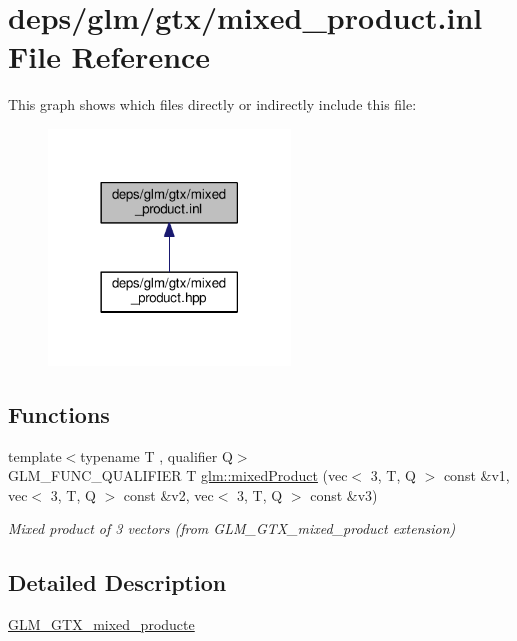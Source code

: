 \hypertarget{mixed__product_8inl}{}\section{deps/glm/gtx/mixed\+\_\+product.inl File Reference}
\label{mixed__product_8inl}
This graph shows which files directly or indirectly include this file\+:
\nopagebreak
\begin{figure}[H]
\begin{center}
\leavevmode
\includegraphics[width=182pt]{d0/d78/mixed__product_8inl__dep__incl}
\end{center}
\end{figure}
\subsection*{Functions}
\begin{DoxyCompactItemize}
\item 
{\footnotesize template$<$typename T , qualifier Q$>$ }\\G\+L\+M\+\_\+\+F\+U\+N\+C\+\_\+\+Q\+U\+A\+L\+I\+F\+I\+ER T \hyperlink{group__gtx__mixed__product_gab3c6048fbb67f7243b088a4fee48d020}{glm\+::mixed\+Product} (vec$<$ 3, T, Q $>$ const \&v1, vec$<$ 3, T, Q $>$ const \&v2, vec$<$ 3, T, Q $>$ const \&v3)
\begin{DoxyCompactList}\small\item\em Mixed product of 3 vectors (from G\+L\+M\+\_\+\+G\+T\+X\+\_\+mixed\+\_\+product extension) \end{DoxyCompactList}\end{DoxyCompactItemize}


\subsection{Detailed Description}
\hyperlink{group__gtx__mixed__product}{G\+L\+M\+\_\+\+G\+T\+X\+\_\+mixed\+\_\+producte} 